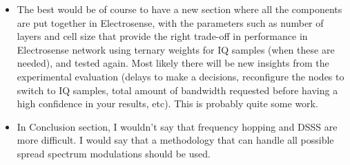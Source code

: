 {\begin{itemize}
\item The best would be of course to have a new section where all the components are put together in Electrosense, with the parameters such as number of layers and cell size that provide the right trade-off in performance in Electrosense network using ternary weights for IQ samples (when these are needed), and tested again. Most likely there will be new insights from the experimental evaluation (delays to make a decisions, reconfigure the nodes to switch to IQ samples, total amount of bandwidth requested before having a high confidence in your results, etc). This is probably quite some work.
\item In Conclusion section, I wouldn't say that frequency hopping and DSSS are more difficult. I would say that a methodology that can handle all possible spread spectrum modulations should be used.
\end{itemize}
}

